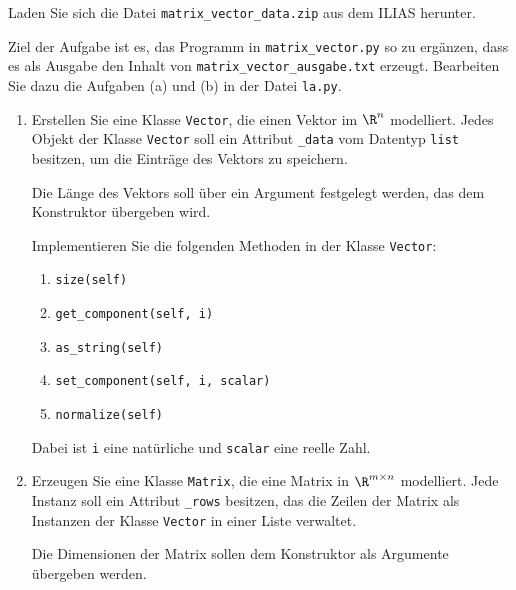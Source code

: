 Laden Sie sich die Datei \lstinline{matrix_vector_data.zip} aus dem ILIAS herunter.

Ziel der Aufgabe ist es, das Programm in \lstinline{matrix_vector.py} so zu ergänzen, dass es als Ausgabe den Inhalt von \lstinline{matrix_vector_ausgabe.txt} erzeugt. Bearbeiten Sie dazu die Aufgaben (a) und (b) in der Datei \lstinline{la.py}.
\vspace{-0.8em}
\begin{enumerate}
    \item
        Erstellen Sie eine Klasse \lstinline{Vector}, die einen Vektor im $\R^n$ modelliert. Jedes Objekt der Klasse \lstinline{Vector} soll ein Attribut \lstinline{_data} vom Datentyp \lstinline{list} besitzen, um die Einträge des Vektors zu speichern.
        
        Die Länge des Vektors soll über ein Argument festgelegt werden, das dem Konstruktor übergeben wird.
        
        Implementieren Sie die folgenden Methoden in der Klasse \lstinline{Vector}:
        \begin{multicols}{3}
            \begin{enumerate}
                \item \lstinline{size(self)}
                \item \lstinline{get_component(self, i)}
                \item \lstinline{as_string(self)}
                \item \lstinline{set_component(self, i, scalar)}
                \item \lstinline{normalize(self)}
            \end{enumerate}
        \end{multicols}\vspace{-0.5em}
        Dabei ist \lstinline{i} eine natürliche und \lstinline{scalar} eine reelle Zahl.
        

    \item
        Erzeugen Sie eine Klasse \lstinline{Matrix}, die eine Matrix in $\R^{m \times n}$ modelliert. Jede Instanz soll ein Attribut \lstinline{_rows} besitzen, das die Zeilen der Matrix als Instanzen der Klasse \lstinline{Vector} in einer Liste verwaltet.
        
        Die Dimensionen der Matrix sollen dem Konstruktor als Argumente übergeben werden.
        

\end{enumerate}
